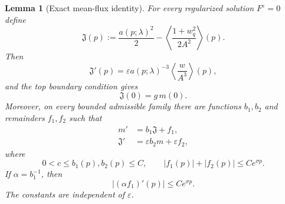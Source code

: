 \documentclass[11pt,reqno]{amsart}
\numberwithin{equation}{section}
\newtheorem{lemma}[theorem]{Lemma}
\theoremstyle{definition}
\theoremstyle{remark}
\begin{document}
\begin{lemma}[Exact mean-flux identity]
\label{lem5.3-tail}
For every regularized solution $F^\varepsilon=0$ define
\begin{equation}\label{eq5dw:Jdef}
 \mathfrak J(p):=
 \frac{a(p;\lambda)^2}{2}
 -\left\langle\frac{1+w_q^2}{2A^2}\right\rangle(p).
\end{equation}
Then
\begin{equation}\label{eq5dw:Jprime}
 \mathfrak J'(p)=
 \varepsilon a(p;\lambda)^{-3}
 \left\langle\frac{w}{A^3}\right\rangle(p),
\end{equation}
and the top boundary condition gives
\begin{equation}\label{eq5dw:Jtop}
 \mathfrak J(0)=g\,m(0).
\end{equation}
Moreover, on every bounded admissible family there are functions
$b_1,b_2$ and remainders $f_1,f_2$ such that
\begin{equation}\label{eq5dw:slow-system}
 \begin{aligned}
 m'&=b_1\mathfrak J+f_1,\\
 \mathfrak J'&=\varepsilon b_2m+\varepsilon f_2,
 \end{aligned}
\end{equation}
where
\begin{equation}\label{eq5dw:slow-coeff}
 0<c\le b_1(p),b_2(p)\le C,
 \qquad |f_1(p)|+|f_2(p)|\le Ce^{\sigma p}.
\end{equation}
If $\alpha=b_1^{-1}$, then
\begin{equation}\label{eq5dw:alphaf1}
 |(\alpha f_1)'(p)|\le Ce^{\sigma p}.
\end{equation}
The constants are independent of $\varepsilon$.
\end{lemma}
\end{document}
